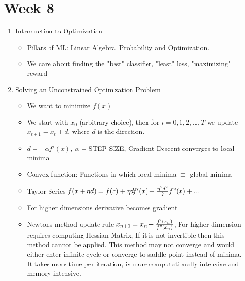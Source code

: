 \documentclass[a4paper]{article}
\begin{document}
 \section{Week 8}
 \begin{enumerate}
     \item Introduction to Optimization
     \begin{itemize}
         \item Pillars of ML: Linear Algebra, Probability and Optimization.
         \item We care about finding the "best" classifier, "least" loss, "maximizing" reward
     \end{itemize}
     \item Solving an Unconstrained Optimization Problem
     \begin{itemize}
         \item We want to minimize $f(x)$ 
         \item We start with $x_0$ (arbitrary choice), then for $t = 0,1,2,...,T$ we update $x_{t+1} = x_t +d$, where $d$ is the direction.
         \item $d=-\alpha f'(x)$, $\alpha$ = STEP SIZE, Gradient Descent converges to local minima
         \item Convex function: Functions in which local minima $\equiv$ global minima
         \item Taylor Series $f(x+\eta d) = f(x) + \eta df'(x) + \frac{\eta^2d^2}{2}f"(x) + ...$
         \item For higher dimensions derivative becomes gradient
         \item Newtons method update rule $x_{n+1} = x_n - \frac{f'(x_n)}{f"(x_n)}$, For higher dimension requires computing Hessian Matrix, If it is not invertible then this method cannot be applied. This method may not converge and would either enter infinite cycle or converge to saddle point instead of minima. It takes more time per iteration, is more computationally intensive and memory intensive.
     \end{itemize}
 \end{enumerate}
\end{document}
